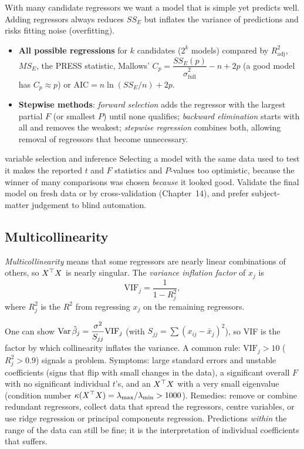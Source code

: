 With many candidate regressors we want a model that is simple yet predicts well. Adding regressors always reduces $SS_E$ but inflates the variance of predictions and risks fitting noise (overfitting).

\begin{itemize}
  \item \textbf{All possible regressions} for $k$ candidates ($2^k$ models) compared by $R^2_{\mathrm{adj}}$, $MS_E$, the PRESS statistic, Mallows' $C_p=\dfrac{SS_E(p)}{\hat\sigma^2_{\mathrm{full}}}-n+2p$ (a good model has $C_p\approx p$) or AIC$=n\ln(SS_E/n)+2p$.
  \item \textbf{Stepwise methods}: \emph{forward selection} adds the regressor with the largest partial $F$ (or smallest $P$) until none qualifies; \emph{backward elimination} starts with all and removes the weakest; \emph{stepwise regression} combines both, allowing removal of regressors that become unnecessary.
\end{itemize}

\begin{pitfall}{variable selection and inference}
Selecting a model with the same data used to test it makes the reported $t$ and $F$ statistics and $P$-values too optimistic, because the winner of many comparisons was chosen \emph{because} it looked good. Validate the final model on fresh data or by cross-validation (Chapter~14), and prefer subject-matter judgement to blind automation.
\end{pitfall}

\subsection{Multicollinearity}

\begin{definition}
\emph{Multicollinearity} means that some regressors are nearly linear combinations of others, so $X^{\top} X$ is nearly singular. The \emph{variance inflation factor} of $x_j$ is
\[ \mathrm{VIF}_j=\frac1{1-R_j^2}, \]
where $R_j^2$ is the $R^2$ from regressing $x_j$ on the remaining regressors.
\end{definition}

One can show $\operatorname{Var}\hat\beta_j=\dfrac{\sigma^2}{S_{jj}}\mathrm{VIF}_j$ (with $S_{jj}=\sum(x_{ij}-\bar{x}_j)^2$), so VIF is the factor by which collinearity inflates the variance. A common rule: $\mathrm{VIF}_j>10$ ($R_j^2>0.9$) signals a problem. Symptoms: large standard errors and unstable coefficients (signs that flip with small changes in the data), a significant overall $F$ with no significant individual $t$'s, and an $X^{\top} X$ with a very small eigenvalue (condition number $\kappa(X^{\top} X)=\lambda_{\max}/\lambda_{\min}>1000$). Remedies: remove or combine redundant regressors, collect data that spread the regressors, centre variables, or use ridge regression or principal components regression. Predictions \emph{within} the range of the data can still be fine; it is the interpretation of individual coefficients that suffers.

